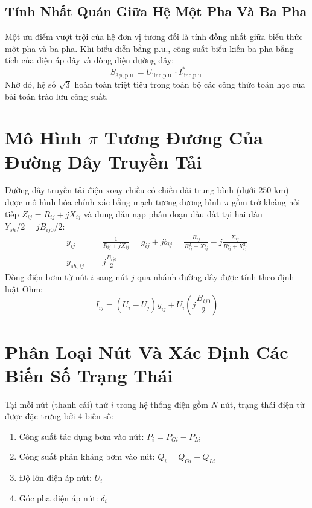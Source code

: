 \documentclass[12pt,a4paper,oneside]{report}
\begin{document}
\subsection{Tính Nhất Quán Giữa Hệ Một Pha Và Ba Pha}
Một ưu điểm vượt trội của hệ đơn vị tương đối là tính đồng nhất giữa biểu thức một pha và ba pha. Khi biểu diễn bằng p.u., công suất biểu kiến ba pha bằng tích của điện áp dây và dòng điện đường dây:
\begin{equation}
S_{\text{3}\phi,\text{p.u.}} = U_{\text{line,p.u.}} \cdot I_{\text{line,p.u.}}^*
\end{equation}
Nhờ đó, hệ số $\sqrt{3}$ hoàn toàn triệt tiêu trong toàn bộ các công thức toán học của bài toán trào lưu công suất.

\section{Mô Hình $\pi$ Tương Đương Của Đường Dây Truyền Tải}
Đường dây truyền tải điện xoay chiều có chiều dài trung bình (dưới $250\text{ km}$) được mô hình hóa chính xác bằng mạch tương đương hình $\pi$ gồm trở kháng nối tiếp $Z_{ij} = R_{ij} + jX_{ij}$ và dung dẫn nạp phân đoạn đấu đất tại hai đầu $Y_{sh}/2 = j B_{ij0}/2$:
\begin{align}
y_{ij} &= \frac{1}{R_{ij} + jX_{ij}} = g_{ij} + jb_{ij} = \frac{R_{ij}}{R_{ij}^2 + X_{ij}^2} - j \frac{X_{ij}}{R_{ij}^2 + X_{ij}^2} \\
y_{sh,ij} &= j \frac{B_{ij0}}{2}
\end{align}
Dòng điện bơm từ nút $i$ sang nút $j$ qua nhánh đường dây được tính theo định luật Ohm:
\begin{equation}
\dot{I}_{ij} = (\dot{U}_i - \dot{U}_j) y_{ij} + \dot{U}_i \left( j \frac{B_{ij0}}{2} \right)
\end{equation}

\section{Phân Loại Nút Và Xác Định Các Biến Số Trạng Thái}
Tại mỗi nút (thanh cái) thứ $i$ trong hệ thống điện gồm $N$ nút, trạng thái điện từ được đặc trưng bởi 4 biến số:
\begin{enumerate}
    \item Công suất tác dụng bơm vào nút: $P_i = P_{Gi} - P_{Li}$
    \item Công suất phản kháng bơm vào nút: $Q_i = Q_{Gi} - Q_{Li}$
    \item Độ lớn điện áp nút: $U_i$
    \item Góc pha điện áp nút: $\delta_i$
\end{enumerate}
\end{document}
